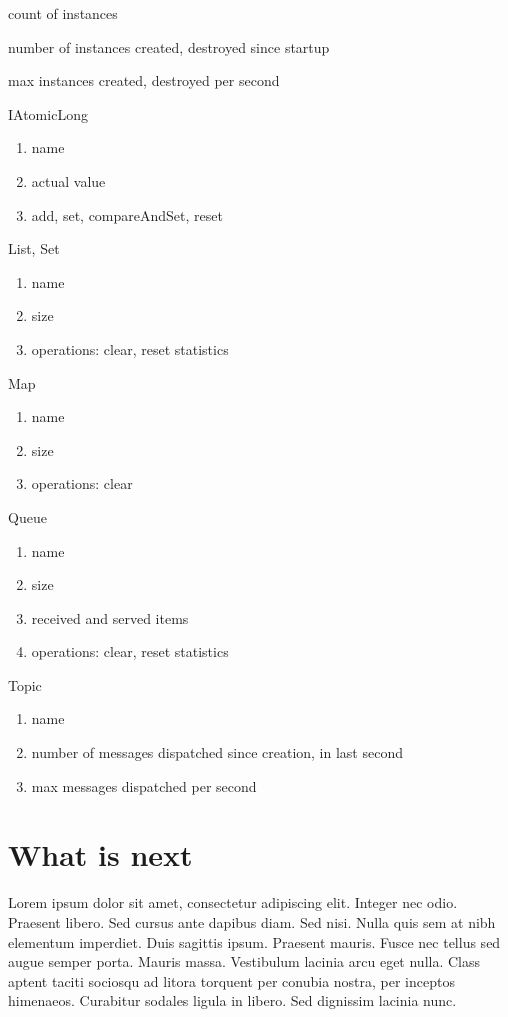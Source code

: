 count of instances

number of instances created, destroyed since startup

max instances created, destroyed per second

IAtomicLong
\begin{enumerate}
\item name
\item actual value
\item add, set, compareAndSet, reset
\end{enumerate}

List, Set
\begin{enumerate}
\item name
\item size
\item operations: clear, reset statistics
\end{enumerate}

Map
\begin{enumerate}
\item name
\item size
\item operations: clear
\end{enumerate}

Queue
\begin{enumerate}
\item name
\item size
\item received and served items
\item operations: clear, reset statistics
\end{enumerate}

Topic
\begin{enumerate}
\item name
\item number of messages dispatched since creation, in last second
\item max messages dispatched per second
\end{enumerate}

\section{What is next}

Lorem ipsum dolor sit amet, consectetur adipiscing elit. Integer nec odio. Praesent libero. Sed cursus ante dapibus diam. Sed nisi. Nulla quis sem at nibh elementum imperdiet. Duis sagittis ipsum. Praesent mauris. Fusce nec tellus sed augue semper porta. Mauris massa. Vestibulum lacinia arcu eget nulla. Class aptent taciti sociosqu ad litora torquent per conubia nostra, per inceptos himenaeos. Curabitur sodales ligula in libero. Sed dignissim lacinia nunc. 
